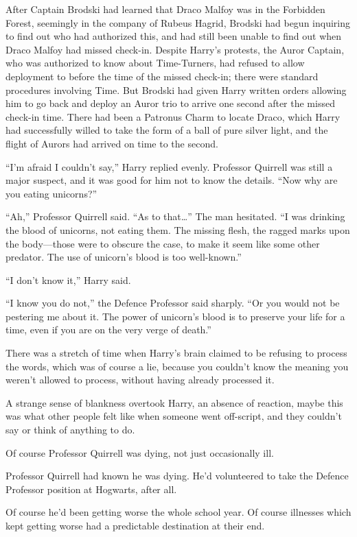 After Captain Brodski had learned that Draco Malfoy was in the Forbidden Forest, seemingly in the company of Rubeus Hagrid, Brodski had begun inquiring to find out who had authorized this, and had still been unable to find out when Draco Malfoy had missed check-in. Despite Harry’s protests, the Auror Captain, who was authorized to know about Time-Turners, had refused to allow deployment to before the time of the missed check-in; there were standard procedures involving Time. But Brodski had given Harry written orders allowing him to go back and deploy an Auror trio to arrive one second after the missed check-in time. There had been a Patronus Charm to locate Draco, which Harry had successfully willed to take the form of a ball of pure silver light, and the flight of Aurors had arrived on time to the second.

“I’m afraid I couldn’t say,” Harry replied evenly. Professor Quirrell was still a major suspect, and it was good for him not to know the details. “Now why are you eating unicorns?”

“Ah,” Professor Quirrell said. “As to that…” The man hesitated. “I was drinking the blood of unicorns, not eating them. The missing flesh, the ragged marks upon the body—those were to obscure the case, to make it seem like some other predator. The use of unicorn’s blood is too well-known.”

“I don’t know it,” Harry said.

“I know you do not,” the Defence Professor said sharply. “Or you would not be pestering me about it. The power of unicorn’s blood is to preserve your life for a time, even if you are on the very verge of death.”

There was a stretch of time when Harry’s brain claimed to be refusing to process the words, which was of course a lie, because you couldn’t know the meaning you weren’t allowed to process, without having already processed it.

A strange sense of blankness overtook Harry, an absence of reaction, maybe this was what other people felt like when someone went off-script, and they couldn’t say or think of anything to do.

Of course Professor Quirrell was dying, not just occasionally ill.

Professor Quirrell had known he was dying. He’d volunteered to take the Defence Professor position at Hogwarts, after all.

Of course he’d been getting worse the whole school year. Of course illnesses which kept getting worse had a predictable destination at their end.

